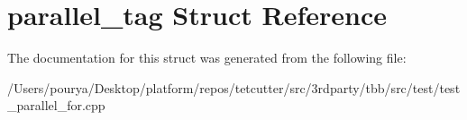 \hypertarget{structparallel__tag}{}\section{parallel\+\_\+tag Struct Reference}
\label{structparallel__tag}


The documentation for this struct was generated from the following file\+:\begin{DoxyCompactItemize}
\item 
/\+Users/pourya/\+Desktop/platform/repos/tetcutter/src/3rdparty/tbb/src/test/test\+\_\+parallel\+\_\+for.\+cpp\end{DoxyCompactItemize}
